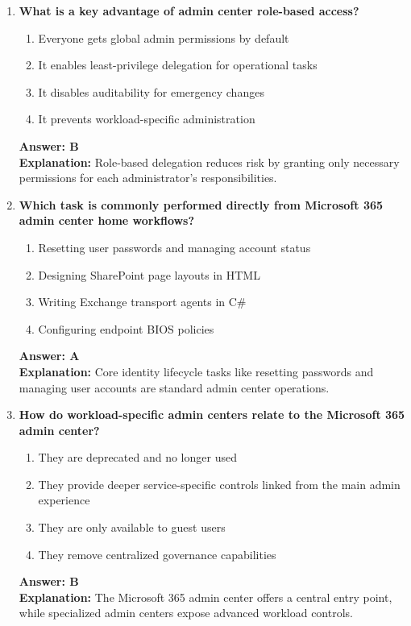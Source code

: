 \documentclass[10pt]{article}
\begin{document}
\begin{enumerate}[leftmargin=*]
\item \textbf{What is a key advantage of admin center role-based access?}
\begin{enumerate}[label=\Alph*.]
  \item Everyone gets global admin permissions by default
  \item It enables least-privilege delegation for operational tasks
  \item It disables auditability for emergency changes
  \item It prevents workload-specific administration
\end{enumerate}
\textbf{Answer: B}\\
\textbf{Explanation:} Role-based delegation reduces risk by granting only necessary permissions for each administrator's responsibilities.

\item \textbf{Which task is commonly performed directly from Microsoft 365 admin center home workflows?}
\begin{enumerate}[label=\Alph*.]
  \item Resetting user passwords and managing account status
  \item Designing SharePoint page layouts in HTML
  \item Writing Exchange transport agents in C\#
  \item Configuring endpoint BIOS policies
\end{enumerate}
\textbf{Answer: A}\\
\textbf{Explanation:} Core identity lifecycle tasks like resetting passwords and managing user accounts are standard admin center operations.

\item \textbf{How do workload-specific admin centers relate to the Microsoft 365 admin center?}
\begin{enumerate}[label=\Alph*.]
  \item They are deprecated and no longer used
  \item They provide deeper service-specific controls linked from the main admin experience
  \item They are only available to guest users
  \item They remove centralized governance capabilities
\end{enumerate}
\textbf{Answer: B}\\
\textbf{Explanation:} The Microsoft 365 admin center offers a central entry point, while specialized admin centers expose advanced workload controls.


\end{enumerate}
\end{document}
